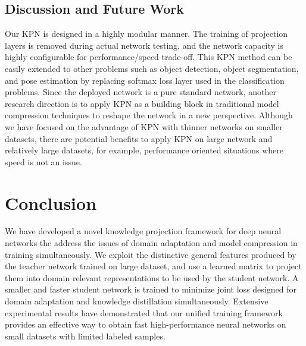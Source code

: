 \documentclass[journal]{IEEEtran}
\begin{document}
\subsection{Discussion and Future Work}
Our KPN is designed in a highly modular manner. The training of projection layers is removed during actual network testing, and the network capacity is highly configurable for performance/speed trade-off. This KPN method can be easily extended to other problems such as object detection, object segmentation, and pose estimation by replacing softmax loss layer used in the  classification problems. Since the deployed network is a pure standard network, another research direction is to apply KPN as a building block in traditional model compression techniques to reshape the network in a new perspective. Although we have focused on the advantage of KPN with thinner networks on smaller datasets, there are  potential benefits to apply KPN on large network and relatively large datasets, for example, performance oriented situations where speed is not an issue. 


\section{Conclusion}
\label{sec:con}
We have developed a novel knowledge projection framework for deep neural networks the address the issues of domain adaptation and model compression in training simultaneously. We exploit the distinctive general features produced by the  teacher network trained on large dataset, and use a learned matrix to project them into domain relevant representations to be used by the student network. A smaller and faster student network is trained to minimize joint loss designed for domain adaptation and knowledge distillation simultaneously. Extensive experimental results have demonstrated that our unified training framework provides an effective way to obtain fast high-performance neural networks on small datasets
with limited labeled samples.





\end{document}
